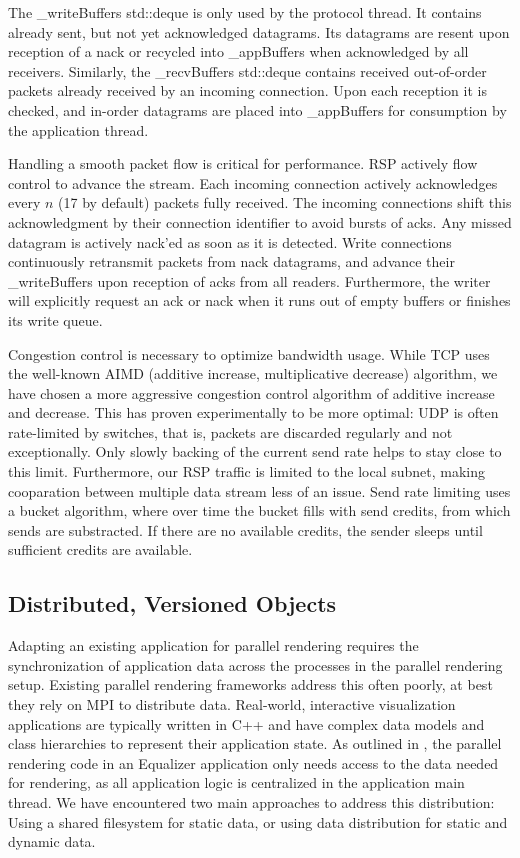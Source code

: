 \documentclass[10pt,journal,compsoc]{IEEEtran}
\begin{document}
The \textsf{\_writeBuffers std::deque} is only used by the protocol
thread. It contains already sent, but not yet acknowledged datagrams. Its
datagrams are resent upon reception of a nack or recycled into
\textsf{\_appBuffers} when acknowledged by all receivers. Similarly, the
\textsf{\_recvBuffers std::deque} contains received out-of-order packets already
received by an incoming connection. Upon each reception it is checked, and
in-order datagrams are placed into \textsf{\_appBuffers} for consumption by the
application thread.

Handling a smooth packet flow is critical for performance. RSP actively flow
control to advance the stream. Each incoming connection actively acknowledges
every $n$ (17 by default) packets fully received. The incoming connections shift
this acknowledgment by their connection identifier to avoid bursts of acks. Any
missed datagram is actively nack'ed as soon as it is detected. Write connections
continuously retransmit packets from nack datagrams, and advance their
\textsf{\_writeBuffers} upon reception of acks from all readers. Furthermore,
the writer will explicitly request an ack or nack when it runs out of empty
buffers or finishes its write queue.

Congestion control is necessary to optimize bandwidth usage. While TCP uses the
well-known AIMD (additive increase, multiplicative decrease) algorithm, we have
chosen a more aggressive congestion control algorithm of additive increase and
decrease. This has proven experimentally to be more optimal: UDP is often
rate-limited by switches, that is, packets are discarded regularly and not
exceptionally. Only slowly backing of the current send rate helps to stay close
to this limit. Furthermore, our RSP traffic is limited to the local subnet,
making cooparation between multiple data stream less of an issue. Send rate
limiting uses a bucket algorithm, where over time the bucket fills with send
credits, from which sends are substracted. If there are no available credits,
the sender sleeps until sufficient credits are available.

\subsection{Distributed, Versioned Objects}

Adapting an existing application for parallel rendering requires the
synchronization of application data across the processes in the parallel
rendering setup. Existing parallel rendering frameworks address this often
poorly, at best they rely on MPI to distribute data. Real-world, interactive
visualization applications are typically written in C++ and have complex data
models and class hierarchies to represent their application state. As outlined
in \cite{EMP:09}, the parallel rendering code in an Equalizer application only
needs access to the data needed for rendering, as all application logic is
centralized in the application main thread. We have encountered two main
approaches to address this distribution: Using a shared filesystem for static
data, or using data distribution for static and dynamic data.
\end{document}
